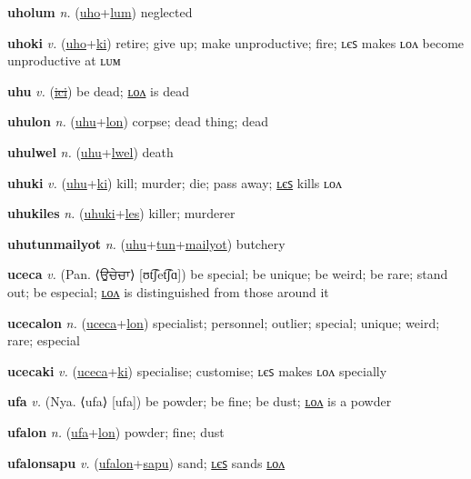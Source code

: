 \textbf{\hypertarget{uholum}{uholum}} \textit{n.} (\hyperlink{uho}{uho}+\allowbreak \hyperlink{lum}{lum})
neglected

\textbf{\hypertarget{uhoki}{uhoki}} \textit{v.} (\hyperlink{uho}{uho}+\allowbreak \hyperlink{ki}{ki})
retire; give up; make unproductive; fire; ʟєꜱ makes ʟᴏᴧ become unproductive at ʟᴜᴍ

\textbf{\hypertarget{uhu}{uhu}} \textit{v.} (\hyperlink{ici}{\sout{ici}})
be dead; \hyperlink{uhulon}{ʟᴏᴧ} is dead

\textbf{\hypertarget{uhulon}{uhulon}} \textit{n.} (\hyperlink{uhu}{uhu}+\allowbreak \hyperlink{lon}{lon})
corpse; dead thing; dead

\textbf{\hypertarget{uhulwel}{uhulwel}} \textit{n.} (\hyperlink{uhu}{uhu}+\allowbreak \hyperlink{lwel}{lwel})
death

\textbf{\hypertarget{uhuki}{uhuki}} \textit{v.} (\hyperlink{uhu}{uhu}+\allowbreak \hyperlink{ki}{ki})
kill; murder; die; pass away; \hyperlink{uhukiles}{ʟєꜱ} kills ʟᴏᴧ

\textbf{\hypertarget{uhukiles}{uhukiles}} \textit{n.} (\hyperlink{uhuki}{uhuki}+\allowbreak \hyperlink{les}{les})
killer; murderer

\textbf{\hypertarget{uhutunmailyot}{uhutunmailyot}} \textit{n.} (\hyperlink{uhu}{uhu}+\allowbreak \hyperlink{tun}{tun}+\allowbreak \hyperlink{mailyot}{mailyot})
butchery

\textbf{\hypertarget{uceca}{uceca}} \textit{v.} (Pan. ⟨{\gurmukhi{}ਉਚੇਚਾ}⟩ [ʊt͡ʃet͡ʃɑ])
be special; be unique; be weird; be rare; stand out; be especial; \hyperlink{ucecalon}{ʟᴏᴧ} is distinguished from those around it

\textbf{\hypertarget{ucecalon}{ucecalon}} \textit{n.} (\hyperlink{uceca}{uceca}+\allowbreak \hyperlink{lon}{lon})
specialist; personnel; outlier; special; unique; weird; rare; especial

\textbf{\hypertarget{ucecaki}{ucecaki}} \textit{v.} (\hyperlink{uceca}{uceca}+\allowbreak \hyperlink{ki}{ki})
specialise; customise; ʟєꜱ makes ʟᴏᴧ specially

\textbf{\hypertarget{ufa}{ufa}} \textit{v.} (Nya. ⟨ufa⟩ [ufa])
be powder; be fine; be dust; \hyperlink{ufalon}{ʟᴏᴧ} is a powder

\textbf{\hypertarget{ufalon}{ufalon}} \textit{n.} (\hyperlink{ufa}{ufa}+\allowbreak \hyperlink{lon}{lon})
powder; fine; dust

\textbf{\hypertarget{ufalonsapu}{ufalonsapu}} \textit{v.} (\hyperlink{ufalon}{ufalon}+\allowbreak \hyperlink{sapu}{sapu})
sand; \hyperlink{ufalonsapules}{ʟєꜱ} sands \hyperlink{ufalonsapulon}{ʟᴏᴧ}

